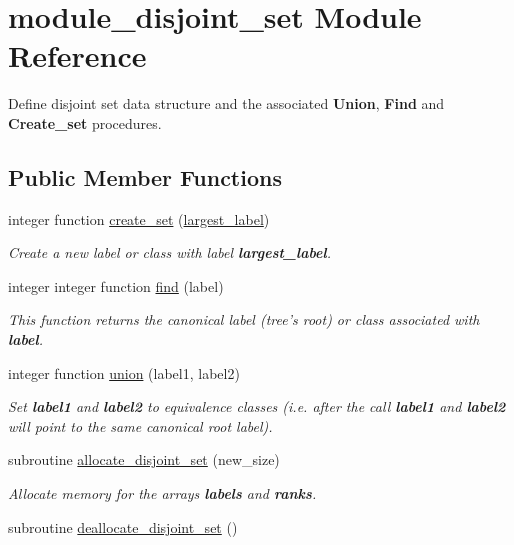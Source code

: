 \hypertarget{classmodule__disjoint__set}{
\section{module\-\_\-disjoint\-\_\-set \-Module \-Reference}
\label{classmodule__disjoint__set}
}


\-Define disjoint set data structure and the associated {\bfseries \-Union}, {\bfseries \-Find} and {\bfseries \-Create\-\_\-set} procedures.  


\subsection*{\-Public \-Member \-Functions}
\begin{DoxyCompactItemize}
\item 
integer function \hyperlink{classmodule__disjoint__set_a769c6fb3576cdcd2f96f2cabcf76cf10}{create\-\_\-set} (\hyperlink{classmodule__disjoint__set_a2ef0620ab0fd7047b16e522c4db4c590}{largest\-\_\-label})
\begin{DoxyCompactList}\small\item\em \-Create a new label or class with label {\bfseries largest\-\_\-label}. \end{DoxyCompactList}\item 
integer integer function \hyperlink{classmodule__disjoint__set_aab6780106768f39173390102bb951275}{find} (label)
\begin{DoxyCompactList}\small\item\em \-This function returns the canonical label (tree's root) or class associated with {\bfseries label}. \end{DoxyCompactList}\item 
integer function \hyperlink{classmodule__disjoint__set_a0ce8857aac3e2281a0010c81f02d00f1}{union} (label1, label2)
\begin{DoxyCompactList}\small\item\em \-Set {\bfseries label1} and {\bfseries label2} to equivalence classes (i.\-e. after the call {\bfseries label1} and {\bfseries label2} will point to the same canonical root label). \end{DoxyCompactList}\item 
subroutine \hyperlink{classmodule__disjoint__set_aa43d8eb044efd1e8db88393da2ebb954}{allocate\-\_\-disjoint\-\_\-set} (new\-\_\-size)
\begin{DoxyCompactList}\small\item\em \-Allocate memory for the arrays {\bfseries labels} and {\bfseries ranks}. \end{DoxyCompactList}\item 
subroutine \hyperlink{classmodule__disjoint__set_a717efa42d58a94fd3ba616cce27db828}{deallocate\-\_\-disjoint\-\_\-set} ()
\end{DoxyCompactItemize}

